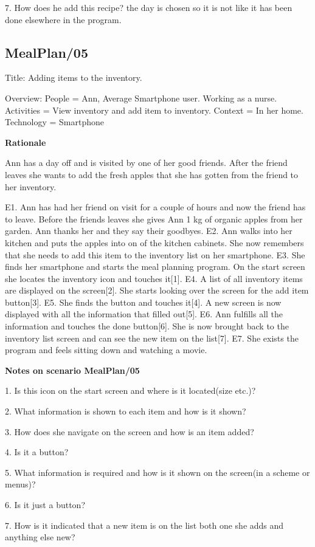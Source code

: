 7. How does he add this recipe? the day is chosen so it is not like it has been done elsewhere in the program.

\subsection{MealPlan/05} \label{MealPlan05}

Title: Adding items to the inventory.

Overview:
	People = Ann, Average Smartphone user. Working as a nurse.
	Activities = View inventory and add item to inventory.
	Context = In her home.
	Technology = Smartphone

\textbf{Rationale}

Ann has a day off and is visited by one of her good friends. After the friend leaves she wants to add the fresh apples that she has gotten from the friend to her inventory.

	E1. Ann has had her friend on visit for a couple of hours and now the friend has to leave. Before the friends leaves she gives Ann 1 kg of organic apples from her garden. Ann thanks her and they say their goodbyes.
	E2. Ann walks into her kitchen and puts the apples into on of the kitchen cabinets. She now remembers that she needs to add this item to the inventory list on her smartphone.
	E3. She finds her smartphone and starts the meal planning program. On the start screen she locates the inventory icon and touches it[1].
	E4. A list of all inventory items are displayed on the screen[2]. She starts looking over the screen for the add item button[3].
	E5. She finds the button and touches it[4]. A new screen is now displayed with all the information that filled out[5]. 
	E6. Ann fulfills all the information and touches the done button[6]. She is now brought back to the inventory list screen and can see the new item on the list[7].
	E7. She exists the program and feels sitting down and watching a movie.

\textbf{Notes on scenario MealPlan/05}

1. Is this icon on the start screen and where is it located(size etc.)?

2. What information is shown to each item and how is it shown?

3. How does she navigate on the screen and how is an item added?

4. Is it a button?

5. What information is required and how is it shown on the screen(in a scheme or menus)?

6. Is it just a button?

7. How is it indicated that a new item is on the list both one she adds and anything else new?